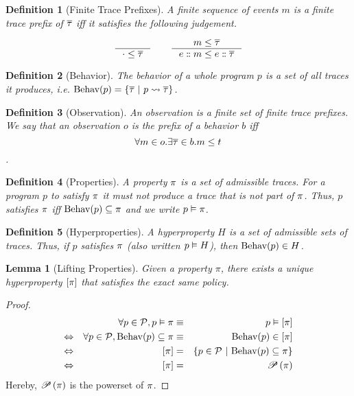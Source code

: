 \documentclass[a4paper,names,dvipsnames]{article}
\newtheorem{definition}{Definition}
\newtheorem{lemma}{Lemma}
\begin{document}
\begin{definition}[Finite Trace Prefixes]
  A finite sequence of events $m$ is a finite trace prefix of $\overline{\tau}$ iff it satisfies the following judgement.

  $$
    \inference{}{\cdot\le\trace}\hspace{2em}\inference{m\le\trace}{\seqcons{e}{m}\le \seqcons{e}{\trace}}
  $$
\end{definition}

\begin{definition}[Behavior]
  The behavior of a whole program $p$ is a set of all traces it produces, i.e. $\behav{p}=\{\trace\ |\ \mktrace{p}{\trace}\}$.
\end{definition}

\begin{definition}[Observation]
  An observation is a finite set of finite trace prefixes.
  We say that an observation $o$ is the prefix of a behavior $b$ iff $$\forall m\in o.\exists \overline{\tau}\in b.m\le t$$.
\end{definition}

\begin{definition}[Properties]
  A property $\pi$ is a set of admissible traces. For a program $p$ to satisfy $\pi$ it must not produce a trace that is not part of $\pi$. Thus, $p$ satisfies $\pi$ iff $\text{Behav}({p})\subseteq\pi$ and we write ${p}\vDash{\pi}$.
\end{definition}

\begin{definition}[Hyperproperties]
  A hyperproperty $H$ is a set of admissible sets of traces. Thus, if $p$ satisfies $\pi$ (also written ${p}\vDash{H}$), then $\text{Behav}({p})\in H$.
\end{definition}

\begin{lemma}[Lifting Properties]
  Given a property $\pi$, there exists a unique hyperproperty $\left[{\pi}\right]$ that satisfies the exact same policy.
\end{lemma}
\begin{proof}
  \begin{align*}
                    && \forall p\in\partials,\sat{p}{\prop}&\equiv&\sat{p}{\lift{\prop}} \\
    \Leftrightarrow && \forall p\in\partials,\behav{p}\subseteq{\prop}&\equiv&\behav{p}\in\lift{\prop} \\
    \Leftrightarrow && \lift{\prop}&=&\left\{p\in\partials\ |\ \behav{p}\subseteq\prop\right\} \\
    \Leftrightarrow && \lift{\prop}&=&\powerset{\prop}
  \end{align*}
  Hereby, $\mathscr{P}\left({\pi}\right)$ is the powerset of $\pi$.
\end{proof}
\end{document}

